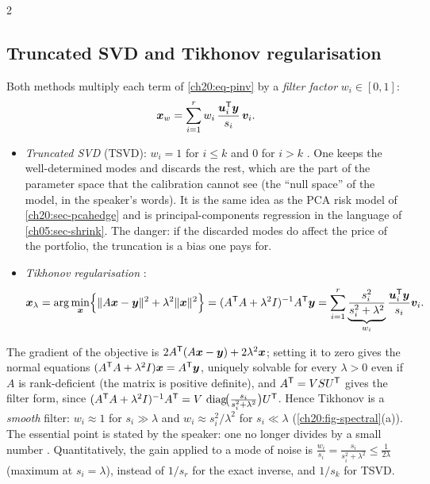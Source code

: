 \begin{paracol}{2}
\subsection{Truncated SVD and Tikhonov regularisation}\label{ch20:sec-tikh}
Both methods multiply each term of \eqref{ch20:eq-pinv} by a \emph{filter factor} $w_i\in[0,1]$:
\begin{equation}\label{ch20:eq-filter}
  \bm x_w=\sum_{i=1}^rw_i\,\frac{\bm u_i^{\mathsf T}\bm y}{s_i}\,\bm v_i .
\end{equation}
\begin{itemize}
  \item \emph{Truncated SVD} (TSVD): $w_i=1$ for $i\le k$ and $0$ for $i>k$ . One keeps the well-determined modes and discards the rest, which are the part of
        the parameter space that the calibration cannot see (the ``null space'' of the model, in the speaker's words). It is the same idea as the PCA risk model of \cref{ch20:sec-pcahedge} and is principal-components regression in the language of \cref{ch05:sec-shrink}.
        The danger: if the discarded modes do affect the price of the portfolio, the truncation is a bias one pays for.
  \item \emph{Tikhonov regularisation} :
        \begin{equation}\label{ch20:eq-tikh}
          \bm x_\lambda=\arg\min_{\bm x}\Bigl\{\|A\bm x-\bm y\|^2+\lambda^2\|\bm x\|^2\Bigr\}=(A^{\mathsf T} A+\lambda^2I)^{-1}A^{\mathsf T}\bm y=\sum_{i=1}^r\underbrace{\frac{s_i^2}{s_i^2+\lambda^2}}_{w_i}\frac{\bm u_i^{\mathsf T}\bm y}{s_i}\bm v_i .
        \end{equation}
\end{itemize}
The gradient of the objective is $2A^{\mathsf T}(A\bm x-\bm y)+2\lambda^2\bm x$; setting it to zero gives the normal equations $(A^{\mathsf T} A+\lambda^2I)\bm x=A^{\mathsf T}\bm y$, uniquely solvable for every $\lambda>0$ even if $A$ is rank-deficient (the matrix is
positive definite), and $A^{\mathsf T}=V S U^{\mathsf T}$ gives the filter form, since $(A^{\mathsf T} A+\lambda^2I)^{-1}A^{\mathsf T}=V\,\operatorname{diag}\!\bigl(\tfrac{s_i}{s_i^2+\lambda^2}\bigr)U^{\mathsf T}$. Hence Tikhonov is a \emph{smooth} filter: $w_i\approx1$ for $s_i\gg\lambda$ and $w_i\approx s_i^2/\lambda^2$ for $s_i\ll\lambda$
(\cref{ch20:fig-spectral}(a)). The essential point is stated by the speaker: one no longer divides by a small number . Quantitatively, the gain applied to a mode of noise is
$\frac{w_i}{s_i}=\frac{s_i}{s_i^2+\lambda^2}\le\frac1{2\lambda}$ (maximum at $s_i=\lambda$), instead of $1/s_r$ for the exact inverse, and $1/s_k$ for TSVD.


\end{paracol}
